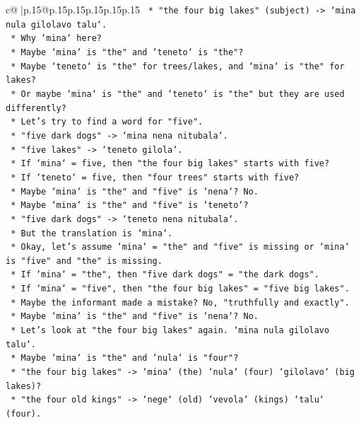 \documentclass{article}
\begin{document}
{\begin{supertabular}{c@{$\;$}|p{.15\linewidth}@{}p{.15\linewidth}p{.15\linewidth}p{.15\linewidth}p{.15\linewidth}p{.15\linewidth}}
{{{\texttt{    *   "the four big lakes" (subject) {-}> `mina nula gilolavo talu`.} \\
\texttt{    *   Why `mina` here?} \\
\texttt{    *   Maybe `mina` is "the" and `teneto` is "the"?} \\
\texttt{    *   Maybe `teneto` is "the" for trees/lakes, and `mina` is "the" for lakes?} \\
\texttt{    *   Or maybe `mina` is "the" and `teneto` is "the" but they are used differently?} \\
\texttt{    *   Let's try to find a word for "five".} \\
\texttt{    *   "five dark dogs" {-}> `mina nena nitubala`.} \\
\texttt{    *   "five lakes" {-}> `teneto gilola`.} \\
\texttt{    *   If `mina` = five, then "the four big lakes" starts with five?} \\
\texttt{    *   If `teneto` = five, then "four trees" starts with five?} \\
\texttt{    *   Maybe `mina` is "the" and "five" is `nena`? No.} \\
\texttt{    *   Maybe `mina` is "the" and "five" is `teneto`?} \\
\texttt{    *   "five dark dogs" {-}> `teneto nena nitubala`.} \\
\texttt{    *   But the translation is `mina`.} \\
\texttt{    *   Okay, let's assume `mina` = "the" and "five" is missing or `mina` is "five" and "the" is missing.} \\
\texttt{    *   If `mina` = "the", then "five dark dogs" = "the dark dogs".} \\
\texttt{    *   If `mina` = "five", then "the four big lakes" = "five big lakes".} \\
\texttt{    *   Maybe the informant made a mistake? No, "truthfully and exactly".} \\
\texttt{    *   Maybe `mina` is "the" and "five" is `nena`? No.} \\
\texttt{    *   Let's look at "the four big lakes" again. `mina nula gilolavo talu`.} \\
\texttt{    *   Maybe `mina` is "the" and `nula` is "four"?} \\
\texttt{    *   "the four big lakes" {-}> `mina` (the) `nula` (four) `gilolavo` (big lakes)?} \\
\texttt{    *   "the four old kings" {-}> `nege` (old) `vevola` (kings) `talu` (four).} \\
}}}
\end{supertabular}}
\end{document}

